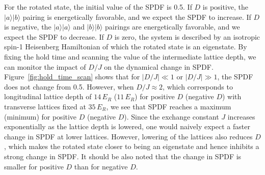 \documentclass[aps,prl,twocolumn,superscriptaddress]{revtex4-1}
\begin{document}
For the rotated state, the initial value of the SPDF is 0.5. If $D$ is positive, the $|a\rangle |b\rangle$ pairing is energetically favorable, and we expect the SPDF to increase. If $D$ is negative, the $|a\rangle|a\rangle$ and $|b\rangle|b\rangle$ pairings are energetically favorable, and we expect the SPDF to decrease. If $D$ is zero, the system is described by an isotropic spin-1 Heisenberg Hamiltonian of which the rotated state is an eigenstate. By fixing the hold time and scanning the value of the intermediate lattice depth, we can monitor the impact of $D/J$ on the dynamical change in SPDF. Figure~\ref{fig:hold_time_scan} shows that for $|D/J| \ll 1$ or $|D/J| \gg 1$, the SPDF does not change from 0.5. However, when $D/J \approx 2$, which corresponds to longitudinal lattice depth of $14\, E_R$ ($11\,E_R$) for positive $D$ (negative $D$) with transverse lattices fixed at $35\,E_R$, we see that SPDF reaches a maximum (minimum) for positive $D$ (negative $D$). Since the exchange constant $J$ increases exponentially as the lattice depth is lowered, one would naively expect a faster change in SPDF at lower lattices. However, lowering of the lattices also reduces $D$, which makes the rotated state closer to being an eigenstate and hence inhibits a strong change in SPDF. It should be also noted that the change in SPDF is smaller for positive $D$ than for negative $D$. 
\end{document}
